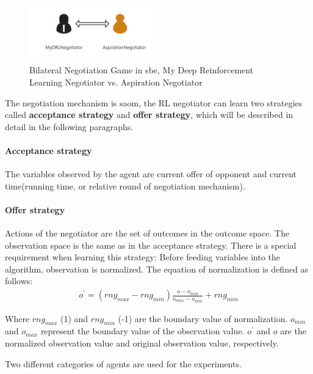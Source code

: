\begin{figure}[htbp]
\centering
\includegraphics[width=0.50\textwidth]{./images/bilateral-negotiation.png}
\caption{Bilateral Negotiation Game in \gls{sbe}, My Deep Reinforcement Learning Negotiator vs. Aspiration Negotiator}
\label{fig:bilateral-negotiation}
\end{figure}

The negotiation mechanism is \gls{saom}, the RL negotiator can learn two strategies called \textbf{acceptance strategy} and \textbf{offer strategy}, which will be described in detail in the following paragraphs. 

\paragraph{Acceptance strategy} The variables observed by the agent are current offer of opponent and current time(running time, or relative round of negotiation mechanism).

\paragraph{Offer strategy} Actions of the negotiator are the set of outcomes in the outcome space. The observation space is the same as in the acceptance strategy. There is a special requirement when learning this strategy: Before feeding variables into the algorithm, observation is normalized. The equation of normalization is defined as follows:
\begin{equation}
\begin{aligned}
o^{\prime} = (rng_{max} - rng_{min}) \frac{o - o_{min}}{o_{max} - o_{min}} + rng_{min}
\end{aligned}
\end{equation}

Where $rng_{max}$ (1) and $rng_{min}$ (-1) are the boundary value of normalization. $o_{min}$ and $o_{max}$ represent the boundary value of the observation value. $o^{\prime}$ and $o$ are the normalized observation value and original observation value, respectively. 

Two different categories of agents are used for the experiments.

